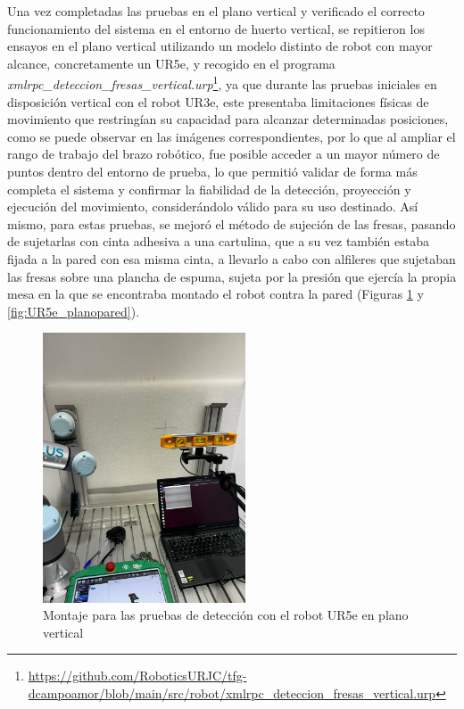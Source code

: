 Una vez completadas las pruebas en el plano vertical y verificado el correcto funcionamiento del sistema en el entorno de huerto vertical, se repitieron los ensayos en el plano vertical utilizando un modelo distinto de robot con mayor alcance, concretamente un UR5e, y recogido en el programa \textit{xmlrpc\_deteccion\_fresas\_vertical.urp}\footnote{\url{https://github.com/RoboticsURJC/tfg-dcampoamor/blob/main/src/robot/xmlrpc\_deteccion\_fresas\_vertical.urp}}, ya que durante las pruebas iniciales en disposición vertical con el robot UR3e, este presentaba limitaciones físicas de movimiento que restringían su capacidad para alcanzar determinadas posiciones, como se puede observar en las imágenes correspondientes, por lo que al ampliar el rango de trabajo del brazo robótico, fue posible acceder a un mayor número de puntos dentro del entorno de prueba, lo que permitió validar de forma más completa el sistema y confirmar la fiabilidad de la detección, proyección y ejecución del movimiento, considerándolo válido para su uso destinado. Así mismo, para estas pruebas, se mejoró el método de sujeción de las fresas, pasando de sujetarlas con cinta adhesiva a una cartulina, que a su vez también estaba fijada a la pared con esa misma cinta, a llevarlo a cabo con alfileres que sujetaban las fresas sobre una plancha de espuma, sujeta por la presión que ejercía la propia mesa en la que se encontraba montado el robot contra la pared (Figuras \ref{fig:montaje_UR5e_vertical} y \ref{fig:UR5e_planopared}).

  \begin{figure}[H]
     \centering
     \begin{center}
       \includegraphics[width=60mm]{figs/Set up coordenadas pruebas plano vertical UR5e_3.jpeg}
     \end{center}
     \caption{Montaje para las pruebas de detección con el robot UR5e en plano vertical}
     \label{fig:montaje_UR5e_vertical}
  \end{figure}

